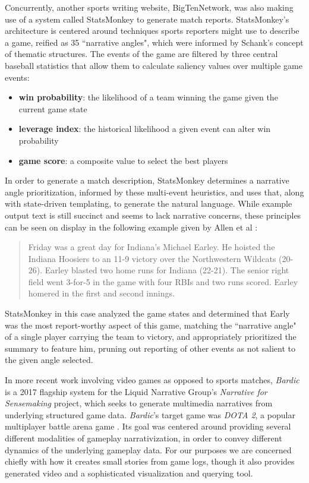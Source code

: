 Concurrently, another sports writing website, BigTenNetwork, was also making use of a system called StatsMonkey \cite{statsmonkey} to generate match reports. StatsMonkey's architecture is centered around techniques sports reporters might use to describe a game, reified as 35 ``narrative angles", which were informed by Schank's concept of thematic structures. The events of the game are filtered by three central baseball statistics that allow them to calculate saliency values over multiple game events:

\begin{itemize}
    \item \textbf{win probability}: the likelihood of a team winning the game given the current game state
    \item \textbf{leverage index}: the historical likelihood a given event can alter win probability
    \item \textbf{game score}: a composite value to select the best players
\end{itemize}

In order to generate a match description, StatsMonkey determines a narrative angle prioritization, informed by these multi-event heuristics, and uses that, along with state-driven templating, to generate the natural language. While example output text is still succinct and seems to lack narrative concerns, these principles can be seen on display in the following example given by Allen et al \cite{statsmonkey}:

\begin{quote}
    Friday was a great day for Indiana’s Michael Earley. He hoisted the Indiana Hoosiers to an 11-9 victory over the Northwestern Wildcats (20-26). Earley blasted two home runs for Indiana (22-21). The senior right field went 3-for-5 in the game with four RBIs and two runs scored. Earley homered in the first and second innings.
\end{quote}

StatsMonkey in this case analyzed the game states and determined that Early was the most report-worthy aspect of this game, matching the ``narrative angle" of a single player carrying the team to victory, and appropriately prioritized the summary to feature him, pruning out reporting of other events as not salient to the given angle selected.

In more recent work involving video games as opposed to sports matches, \textit{Bardic} \cite{barot2017bardic} is a 2017 flagship system for the Liquid Narrative Group's \textit{Narrative for Sensemaking} project, which seeks to generate multimedia narratives from underlying structured game data. \textit{Bardic}'s target game was \textit{DOTA 2}, a popular multiplayer battle arena game \cite{dota}. Its goal was centered around providing several different modalities of gameplay narrativization, in order to convey different dynamics of the underlying gameplay data. For our purposes we are concerned chiefly with how it creates small stories from game logs, though it also provides generated video and a sophisticated visualization and querying tool.

